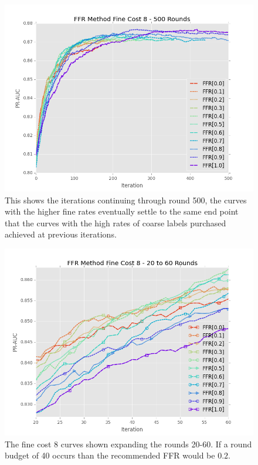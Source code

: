 \documentclass[ms]{nuthesis}
\begin{document}
\FloatBarrier
\begin{figure}[!htb]
	\centering
    \includegraphics[width=1.0\columnwidth]{fig/ParamsFFR_PR_Cost8_rnds0_500}
    \caption{This shows the iterations continuing through round 500, the curves
    with the higher fine rates eventually settle to the same end point that the
    curves with the high rates of coarse labels purchased achieved at previous
    iterations.}
    \label{fig:ParamsFFR_PR_Cost8_rnds0_500}
\end{figure}
\FloatBarrier

\FloatBarrier
\begin{figure}[!htb]
	\centering
    \includegraphics[width=1.0\columnwidth]{fig/ParamsFFR_PR_Cost8_rnds20_60}
    \caption{The fine cost 8 curves shown expanding the rounds 20-60. If a round budget of 40
    occurs than the recommended FFR would be $0.2$.}
    \label{fig:ParamsFFR_PR_Cost8_rnds20_60}
\end{figure}
\FloatBarrier
\end{document}
